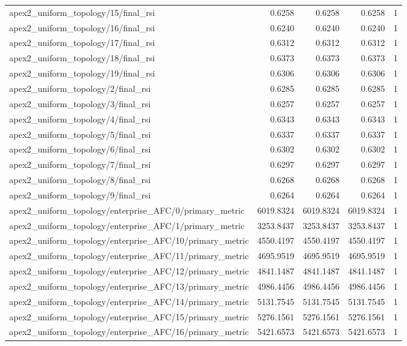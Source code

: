 \begin{table}[h]
\begin{tabular}{lrrrr}
apex2_uniform_topology/15/final_rsi & 0.6258 & 0.6258 & 0.6258 & 1 \\
apex2_uniform_topology/16/final_rsi & 0.6240 & 0.6240 & 0.6240 & 1 \\
apex2_uniform_topology/17/final_rsi & 0.6312 & 0.6312 & 0.6312 & 1 \\
apex2_uniform_topology/18/final_rsi & 0.6373 & 0.6373 & 0.6373 & 1 \\
apex2_uniform_topology/19/final_rsi & 0.6306 & 0.6306 & 0.6306 & 1 \\
apex2_uniform_topology/2/final_rsi & 0.6285 & 0.6285 & 0.6285 & 1 \\
apex2_uniform_topology/3/final_rsi & 0.6257 & 0.6257 & 0.6257 & 1 \\
apex2_uniform_topology/4/final_rsi & 0.6343 & 0.6343 & 0.6343 & 1 \\
apex2_uniform_topology/5/final_rsi & 0.6337 & 0.6337 & 0.6337 & 1 \\
apex2_uniform_topology/6/final_rsi & 0.6302 & 0.6302 & 0.6302 & 1 \\
apex2_uniform_topology/7/final_rsi & 0.6297 & 0.6297 & 0.6297 & 1 \\
apex2_uniform_topology/8/final_rsi & 0.6268 & 0.6268 & 0.6268 & 1 \\
apex2_uniform_topology/9/final_rsi & 0.6264 & 0.6264 & 0.6264 & 1 \\
apex2_uniform_topology/enterprise_AFC/0/primary_metric & 6019.8324 & 6019.8324 & 6019.8324 & 1 \\
apex2_uniform_topology/enterprise_AFC/1/primary_metric & 3253.8437 & 3253.8437 & 3253.8437 & 1 \\
apex2_uniform_topology/enterprise_AFC/10/primary_metric & 4550.4197 & 4550.4197 & 4550.4197 & 1 \\
apex2_uniform_topology/enterprise_AFC/11/primary_metric & 4695.9519 & 4695.9519 & 4695.9519 & 1 \\
apex2_uniform_topology/enterprise_AFC/12/primary_metric & 4841.1487 & 4841.1487 & 4841.1487 & 1 \\
apex2_uniform_topology/enterprise_AFC/13/primary_metric & 4986.4456 & 4986.4456 & 4986.4456 & 1 \\
apex2_uniform_topology/enterprise_AFC/14/primary_metric & 5131.7545 & 5131.7545 & 5131.7545 & 1 \\
apex2_uniform_topology/enterprise_AFC/15/primary_metric & 5276.1561 & 5276.1561 & 5276.1561 & 1 \\
apex2_uniform_topology/enterprise_AFC/16/primary_metric & 5421.6573 & 5421.6573 & 5421.6573 & 1 \\

\end{tabular}
\end{table}
